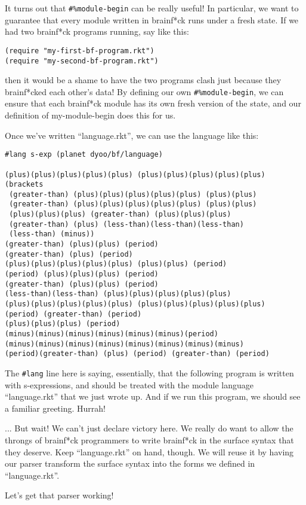 \documentclass{article}
\begin{document}
It turns out that \verb+#%module-begin+ can be really useful! In particular, we want to guarantee that every module written in brainf*ck runs under a fresh state. If we had two brainf*ck programs running, say like this:
\begin{verbatim}
(require "my-first-bf-program.rkt")
(require "my-second-bf-program.rkt")
\end{verbatim}
then it would be a shame to have the two programs clash just because they brainf*cked each other's data! By defining our own \verb+#%module-begin+, we can ensure that each brainf*ck module has its own fresh version of the state, and our definition of my-module-begin does this for us.


Once we've written ``language.rkt'', we can use the language like this:
\begin{verbatim}
#lang s-exp (planet dyoo/bf/language)
 
(plus)(plus)(plus)(plus)(plus) (plus)(plus)(plus)(plus)(plus)
(brackets
 (greater-than) (plus)(plus)(plus)(plus)(plus) (plus)(plus)
 (greater-than) (plus)(plus)(plus)(plus)(plus) (plus)(plus)
 (plus)(plus)(plus) (greater-than) (plus)(plus)(plus)
 (greater-than) (plus) (less-than)(less-than)(less-than)
 (less-than) (minus))
(greater-than) (plus)(plus) (period)
(greater-than) (plus) (period)
(plus)(plus)(plus)(plus)(plus) (plus)(plus) (period)
(period) (plus)(plus)(plus) (period)
(greater-than) (plus)(plus) (period)
(less-than)(less-than) (plus)(plus)(plus)(plus)(plus)
(plus)(plus)(plus)(plus)(plus) (plus)(plus)(plus)(plus)(plus)
(period) (greater-than) (period)
(plus)(plus)(plus) (period)
(minus)(minus)(minus)(minus)(minus)(minus)(period)
(minus)(minus)(minus)(minus)(minus)(minus)(minus)(minus)
(period)(greater-than) (plus) (period) (greater-than) (period)
\end{verbatim}
The \verb+#lang+ line here is saying, essentially, that the following program is written with s-expressions, and should be treated with the module language ``language.rkt'' that we just wrote up. And if we run this program, we should see a familiar greeting. Hurrah!

... But wait! We can't just declare victory here. We really do want to allow the throngs of brainf*ck programmers to write brainf*ck in the surface syntax that they deserve. Keep ``language.rkt'' on hand, though. We will reuse it by having our parser transform the surface syntax into the forms we defined in ``language.rkt''.

Let's get that parser working!
\end{document}
